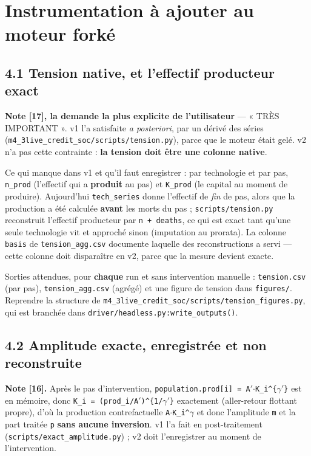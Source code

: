 \documentclass[11pt,a4paper]{article}
\newcommand{\code}[1]{\texttt{#1}}
\begin{document}
\setcounter{section}{3}
\section{Instrumentation à ajouter au moteur forké}

\subsection*{4.1 Tension native, et l'effectif producteur exact}

\textbf{Note [17], la demande la plus explicite de l'utilisateur} --- « TRÈS IMPORTANT ». v1 l'a satisfaite \emph{a posteriori}, par un dérivé des séries (\code{m4\_3live\_credit\_soc/scripts/tension.py}), parce que le moteur était gelé. v2 n'a pas cette contrainte : \textbf{la tension doit être une colonne native}.

Ce qui manque dans v1 et qu'il faut enregistrer : par technologie et par pas, \code{n\_prod} (l'effectif qui a \textbf{produit} au pas) et \code{K\_prod} (le capital au moment de produire). Aujourd'hui \code{tech\_series} donne l'effectif de \emph{fin} de pas, alors que la production a été calculée \textbf{avant} les morts du pas ; \code{scripts/tension.py} reconstruit l'effectif producteur par \code{n + deaths}, ce qui est exact tant qu'une seule technologie vit et approché sinon (imputation au prorata). La colonne \code{basis} de \code{tension\_agg.csv} documente laquelle des reconstructions a servi --- cette colonne doit disparaître en v2, parce que la mesure devient exacte.

Sorties attendues, pour \textbf{chaque} run et sans intervention manuelle : \code{tension.csv} (par pas), \code{tension\_agg.csv} (agrégé) et une figure de tension dans \code{figures/}. Reprendre la structure de \code{m4\_3live\_credit\_soc/scripts/tension\_figures.py}, qui est branchée dans \code{driver/headless.py:write\_outputs()}.

\subsection*{4.2 Amplitude exacte, enregistrée et non reconstruite}

\textbf{Note [16].} Après le pas d'intervention, \code{population.prod[i] = A\ensuremath{'}\ensuremath{\cdot}K\_i\textasciicircum{}\{\ensuremath{\gamma}\ensuremath{'}\}} est en mémoire, donc \code{K\_i = (prod\_i/A\ensuremath{'})\textasciicircum{}\{1/\ensuremath{\gamma}\ensuremath{'}\}} exactement (aller-retour flottant propre), d'où la production contrefactuelle \code{A\ensuremath{\cdot}K\_i\textasciicircum{}\ensuremath{\gamma}} et donc l'amplitude \code{m} et la part traitée \code{p} \textbf{sans aucune inversion}. v1 l'a fait en post-traitement (\code{scripts/exact\_amplitude.py}) ; v2 doit l'enregistrer au moment de l'intervention.
\end{document}

